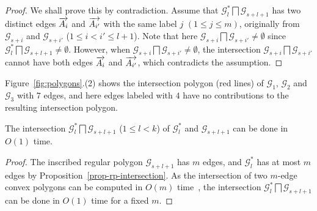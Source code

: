 

\begin{proof}
We shall prove this by contradiction.
Assume that $\mathcal{G}^*_{l} \bigsqcap \mathcal{G}_{s+l+1}$ has two distinct edges $\protect\overrightarrow{A_i}$ and $\protect\overrightarrow{A_{i'}}$  with the same label $j$ $(1\le j \le m)$, originally from
$\mathcal{G}_{s+i}$ and $\mathcal{G}_{s+i'}$  ($1\le i< i' \le l+1$).
%
Note that here $\mathcal{G}_{s+i} \bigsqcap \mathcal{G}_{s+i'} \ne \emptyset$ since $\mathcal{G}^*_l \bigsqcap \mathcal{G}_{s+l+1} \ne \emptyset$.
%
However, when $\mathcal{G}_{s+i} \bigsqcap \mathcal{G}_{s+i'} \ne \emptyset$, the intersection $\mathcal{G}_{s+i} \bigsqcap \mathcal{G}_{s+i'}$ cannot have
both edges $\protect\overrightarrow{A_i}$ and $\protect\overrightarrow{A_{i'}}$, which contradicts the assumption.
\end{proof}



Figure~\ref{fig:polygons}.(2) shows the intersection polygon (red lines) of $\mathcal{G}_1$, $\mathcal{G}_2$ and $\mathcal{G}_3$ with $7$ edges, and here edges labeled with $4$ have no contributions to the resulting intersection polygon.

\begin{prop}
\label{prop-cpi-time}
The intersection $\mathcal{G}^*_l \bigsqcap \mathcal{G}_{s+l+1}$ ($ 1\le l< k$) of $\mathcal{G}^*_l$ and $\mathcal{G}_{s+l+1}$ can be done in $O(1)$
time.
\end{prop}

\begin{proof}
The inscribed regular polygon $\mathcal{G}_{s+l+1}$ has $m$ edges, and  $\mathcal{G}^*_l$ has at most $m$ edges by Proposition~\ref{prop-rp-intersection}.
As the intersection of two $m$-edge convex polygons can be computed in $O(m)$ time~\cite{ORourke:Intersection}, the intersection $\mathcal{G}^*_l \bigsqcap \mathcal{G}_{s+l+1}$ can be done in $O(1)$ time for a fixed $m$.
\end{proof}





